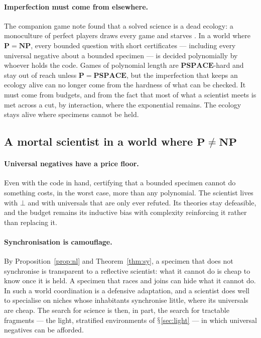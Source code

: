 \documentclass[11pt]{article}
\theoremstyle{definition}
\theoremstyle{plain}
\theoremstyle{remark}
\DeclareRobustCommand{\S}{\ifmmode\mathsection\else$\mathsection$\fi}
\newcommand{\Pclass}{\mathbf{P}}
\newcommand{\NPclass}{\mathbf{NP}}
\begin{document}
\paragraph{Imperfection must come from elsewhere.} The companion game
note found that a solved science is a dead ecology: a monoculture of
perfect players draws every game and starves \cite{GameNote}. In a world
where $\Pclass = \NPclass$, every bounded question with short
certificates --- including every universal negative about a bounded
specimen --- is decided polynomially by whoever holds the code. Games of
polynomial length are $\mathbf{PSPACE}$-hard and stay out of reach unless
$\Pclass = \mathbf{PSPACE}$, but the imperfection that keeps an ecology
alive can no longer come from the hardness of what can be checked. It must come from budgets, and from
the fact that most of what a scientist meets is met across a cut, by
interaction, where the exponential remains. The ecology stays alive where
specimens cannot be held.

\subsection{A mortal scientist in a world where \texorpdfstring{$\Pclass \neq \NPclass$}{P != NP}}

\paragraph{Universal negatives have a price floor.} Even with the code in
hand, certifying that a bounded specimen cannot do something costs, in the
worst case, more than any polynomial. The scientist lives with $\bot$ and
with universals that are only ever refuted. Its theories stay
defeasible, and the budget remains its inductive bias with complexity
reinforcing it rather than replacing it.

\paragraph{Synchronisation is camouflage.} By Proposition~\ref{prop:nl}
and Theorem~\ref{thm:sy}, a specimen that does not synchronise is
transparent to a reflective scientist: what it cannot do is cheap to
know once it is held. A specimen that races and
joins can hide what it cannot do. In such a world coordination is a
defensive adaptation, and a scientist does well to specialise on niches
whose inhabitants synchronise little, where its universals are cheap. The
search for science is then, in part, the search for tractable fragments
--- the light, stratified environments of \S\ref{sec:light} --- in which
universal negatives can be afforded.
\end{document}
